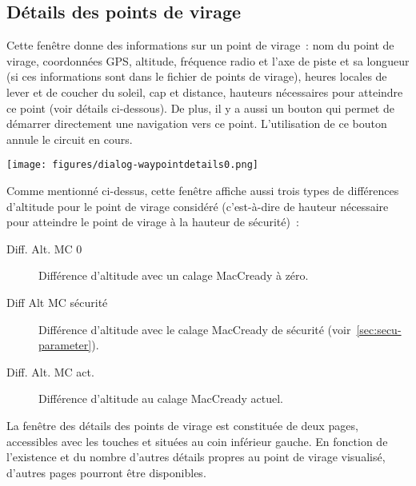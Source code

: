 \subsection*{Détails des points de virage}\label{sec:waypointdetails}
Cette fenêtre donne des informations sur un point de virage~: nom du point de virage,
coordonnées GPS, altitude, fréquence radio et l'axe de piste et sa longueur (si ces informations sont dans le fichier de points de virage),
heures locales de lever et de coucher du soleil, cap et distance, hauteurs nécessaires
pour atteindre ce point (voir détails ci-dessous). De plus, il y a aussi un bouton
 qui permet de démarrer directement
une navigation vers ce point. L'utilisation de ce bouton annule le circuit en cours.
\begin{center}
\texttt{[image: figures/dialog-waypointdetails0.png]}
\end{center}

Comme mentionné ci-dessus, cette fenêtre affiche aussi trois types de différences d'altitude pour le point de virage considéré
(c'est-à-dire de hauteur nécessaire pour atteindre le point de virage à la hauteur de sécurité)~:
\begin{description}
\item[Diff. Alt. MC 0] Différence d'altitude avec un calage MacCready à zéro.
\item[Diff Alt MC sécurité] Différence d'altitude avec le calage MacCready de 
sécurité (voir~\ref{sec:secu-parameter}).
\item[Diff. Alt. MC act.] Différence d'altitude au calage MacCready actuel.
\end{description}

La fenêtre des détails des points de virage est constituée de deux pages, accessibles avec les touches
\bmenuw{$>$} et \bmenuw{$<$} situées au coin inférieur gauche.
En fonction de l'existence et du nombre d'autres détails propres au point de virage visualisé,
d'autres pages pourront être disponibles.

